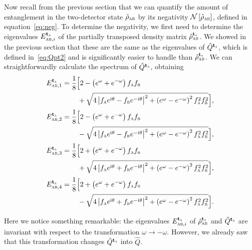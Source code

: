 \documentclass[pra,nofootinbib,floats,aps,twocolumn,tightenlines,superscriptaddress]{revtex4-1}
\newcommand{\ii}{\mathrm{i}}
\newcommand{\rhoab}{\hat{\rho}_\textsc{ab}}
\newcommand{\rhoabpt}{\hat{\rho}_\textsc{ab}^{{\text{\textbf{t}}}_\textsc{a}}}
\newcommand{\fa}{f_\textsc{a}}
\newcommand{\fb}{f_\textsc{b}}
\begin{document}
Now recall from the previous section that we can quantify the amount of entanglement in the two-detector state $\rhoab$ by its negativity $\mathcal{N}\left[\rhoab\right]$, defined in equation~\eqref{eq:neg}. To determine the negativity, we first need to determine the eigenvalues $E_{\textsc{ab},i}^{{\text{\textbf{t}}}_\textsc{a}}$ of the partially transposed density matrix $\rhoabpt$. We showed in the previous section that these are the same as the eigenvalues of $\hat{Q}^{{\text{\textbf{t}}}_\textsc{a}}$, which is defined in~\eqref{eq:Qpt2} and is significantly easier to handle than $\rhoabpt$. We can straightforwardly calculate the spectrum of $\hat{Q}^{{\text{\textbf{t}}}_\textsc{a}}$, obtaining
\begin{align}
\label{eq:e1}
    E_{\textsc{ab},1}^{{\text{\textbf{t}}}_\textsc{a}}&=
    \frac{1}{8}
    \Big[
    2-\left(e^\omega +e^{-\omega}\right)\fa\fb
    \\
    &\hspace{2.2em}+\sqrt{
    4\left|\fa e^{\ii\theta}-\fb e^{-\ii\theta}\right|^2 +
    \left(e^\omega -e^{-\omega}\right)^2 \fa^2\fb^2
    }
    \Big],
    \notag\\
\label{eq:e2}
    E_{\textsc{ab},2}^{{\text{\textbf{t}}}_\textsc{a}}&=
    \frac{1}{8}
    \Big[
    2-\left(e^\omega +e^{-\omega}\right)\fa\fb
    \\
    &\hspace{2.2em}-\sqrt{
    4\left|\fa e^{\ii\theta}-\fb e^{-\ii\theta}\right|^2 +
    \left(e^\omega -e^{-\omega}\right)^2 \fa^2\fb^2
    }
    \Big],
    \notag\\
\label{eq:e3}
    E_{\textsc{ab},3}^{{\text{\textbf{t}}}_\textsc{a}}&=
    \frac{1}{8}
    \Big[
    2+\left(e^\omega +e^{-\omega}\right)\fa\fb
    \\
    &\hspace{2.2em}+\sqrt{
    4\left|\fa e^{\ii\theta}+\fb e^{-\ii\theta}\right|^2 +
    \left(e^\omega -e^{-\omega}\right)^2 \fa^2\fb^2
    }
    \Big],
    \notag\\
\label{eq:e4}
    E_{\textsc{ab},4}^{{\text{\textbf{t}}}_\textsc{a}}&=
    \frac{1}{8}
    \Big[
    2+\left(e^\omega +e^{-\omega}\right)\fa\fb
    \\
    &\hspace{2.2em}-\sqrt{
    4\left|\fa e^{\ii\theta}+\fb e^{-\ii\theta}\right|^2 +
    \left(e^\omega -e^{-\omega}\right)^2 \fa^2\fb^2
    }
    \Big].
    \notag
\end{align}

Here we notice something remarkable: the eigenvalues $E_{\textsc{ab},i}^{{\text{\textbf{t}}}_\textsc{a}}$ of $\rhoabpt$ and $\hat{Q}^{{\text{\textbf{t}}}_\textsc{a}}$ are invariant with respect to the transformation \mbox{$\omega\rightarrow -\omega$}. However, we already saw that this transformation changes $\hat{Q}^{{\text{\textbf{t}}}_\textsc{a}}$ into $\hat{Q}$.
\end{document}
